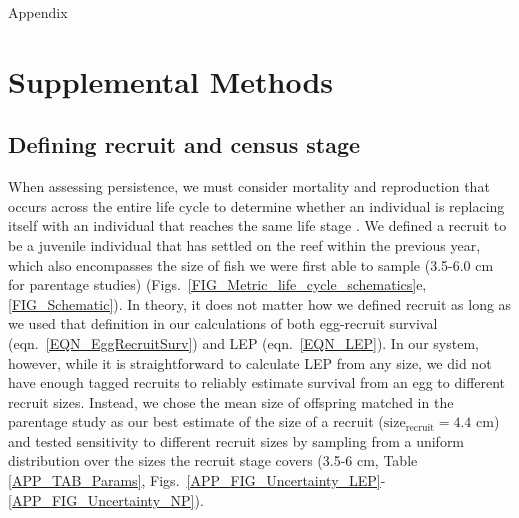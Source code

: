 \documentclass[12pt, oneside]{article}   	%
\begin{document}
{\LARGE Appendix}


\appendix

\renewcommand{\theequation}{A\arabic{equation}}
\renewcommand{\thetable}{A\arabic{table}}
\setcounter{equation}{0}  %
\setcounter{figure}{0}
\setcounter{table}{0}

\section{Supplemental Methods} \label{APP_SUPP_METHODS}

\subsection{Defining recruit and census stage} \label{APP_SEC_METHODS_Recruit_def}

When assessing persistence, we must consider mortality and reproduction that occurs across the entire life cycle to determine whether an individual is replacing itself with an individual that reaches the same life stage \citep{burgess2014beyond}. We defined a recruit to be a juvenile individual that has settled on the reef within the previous year, which also encompasses the size of fish we were first able to sample (3.5-6.0 cm for parentage studies) (Figs.\ \ref{FIG_Metric_life_cycle_schematics}e, \ref{FIG_Schematic}). In theory, it does not matter how we defined recruit as long as we used that definition in our calculations of both egg-recruit survival (eqn.\ \ref{EQN_EggRecruitSurv}) and LEP (eqn.\ \ref{EQN_LEP}). In our system, however, while it is straightforward to calculate LEP from any size, we did not have enough tagged recruits to reliably estimate survival from an egg to different recruit sizes. Instead, we chose the mean size of offspring matched in the parentage study as our best estimate of the size of a recruit ($\text{size}_\text{recruit} = 4.4$ cm) and tested sensitivity to different recruit sizes by sampling from a uniform distribution over the sizes the recruit stage covers (3.5-6 cm, Table \ref{APP_TAB_Params}, Figs.\ \ref{APP_FIG_Uncertainty_LEP}-\ref{APP_FIG_Uncertainty_NP}).
\end{document}

